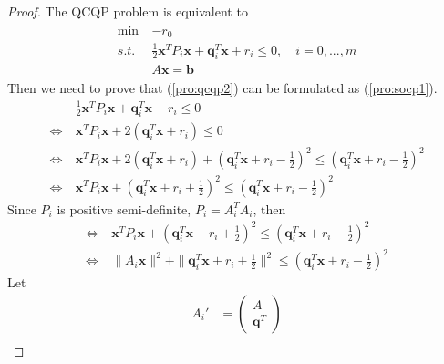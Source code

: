 \begin{proof}
    The QCQP problem is equivalent to
    \begin{align}
        \begin{array}{lll}
            \min \ & - r_0 \\
            s.t. \ &\frac{1}{2} \mathbf{x}^T P_i \mathbf{x}
            + \mathbf{q}_i^T \mathbf{x} + r_i \leq 0, \quad i = 0,...,m \\
            & A \mathbf{x} = \mathbf{b}
            \label{pro:qcqp2}
        \end{array}
    \end{align}
    Then we need to prove that (\ref{pro:qcqp2})
    can be formulated as (\ref{pro:socp1}).
    \begin{align}
        \label{equ:qcqp1}
        &\frac{1}{2} \mathbf{x}^T P_i \mathbf{x}
        + \mathbf{q}_i^T \mathbf{x} + r_i \leq 0 \\
        \Leftrightarrow \ & \mathbf{x}^T P_i \mathbf{x}
        + 2(\mathbf{q}_i^T \mathbf{x} + r_i) \leq 0 \\
        \Leftrightarrow \ & \mathbf{x}^T P_i \mathbf{x}
        + 2(\mathbf{q}_i^T \mathbf{x} + r_i)
        + (\mathbf{q}_i^T \mathbf{x} + r_i - \frac{1}{2})^2
         \leq (\mathbf{q}_i^T \mathbf{x} + r_i - \frac{1}{2})^2 \\
         \Leftrightarrow \ & \mathbf{x}^T P_i \mathbf{x}
         + (\mathbf{q}_i^T \mathbf{x} + r_i + \frac{1}{2})^2
          \leq (\mathbf{q}_i^T \mathbf{x} + r_i - \frac{1}{2})^2
    \end{align}
    Since $P_i$ is positive semi-definite, $P_i = A_i^TA_i$, then
    \begin{align}
        \Leftrightarrow \ & \mathbf{x}^T P_i \mathbf{x}
        + (\mathbf{q}_i^T \mathbf{x} + r_i + \frac{1}{2})^2
         \leq (\mathbf{q}_i^T \mathbf{x} + r_i - \frac{1}{2})^2 \\
         \Leftrightarrow \ & \parallel A_i \mathbf{x} \parallel^2
         + \parallel \mathbf{q}_i^T \mathbf{x} + r_i + \frac{1}{2}\parallel^2
          \leq (\mathbf{q}_i^T \mathbf{x} + r_i - \frac{1}{2})^2 
          \label{equ:qcqp2}
    \end{align}
    Let
    \begin{align}
        A_i' &= \left(
            \begin{array}{ll}
                A \\
                \mathbf{q}^T
            \end{array}\right) \\

\end{align}
\end{proof}
